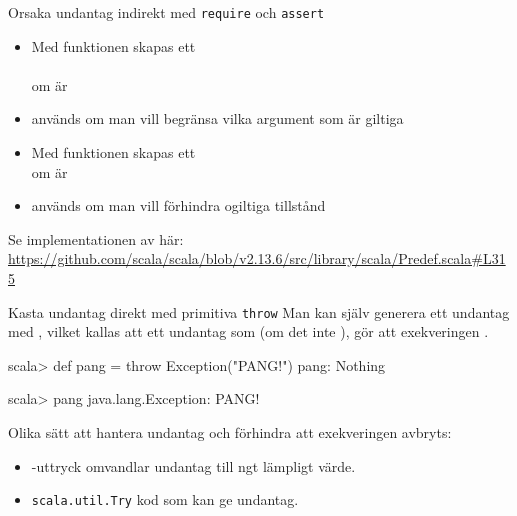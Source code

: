 \begin{Slide}{Orsaka undantag indirekt med \texttt{require} och \texttt{assert}}

\begin{itemize}\SlideFontSmall
  \item Med funktionen  skapas ett \\ \\ om  är 
  \item {} används om man vill begränsa vilka argument som är giltiga
  \item Med funktionen  skapas ett  \\ om  är  
  \item {} används om man vill förhindra ogiltiga tillstånd
\end{itemize}
{
  \ifkompendium\else
  \vfill\SlideFontTiny
  \fi
  Se implementationen av  här:\\
\url{https://github.com/scala/scala/blob/v2.13.6/src/library/scala/Predef.scala#L315}
}
\end{Slide}

\begin{Slide}{Kasta undantag direkt med primitiva \texttt{throw}}\SlideFontSmall
Man kan själv generera ett undantag med , vilket kallas att  ett undantag som (om det inte ), gör att exekveringen .


\begin{REPL}
scala> def pang = throw Exception("PANG!")
pang: Nothing

scala> pang
java.lang.Exception: PANG!

\end{REPL}
\pause
Olika sätt att hantera undantag och förhindra att exekveringen avbryts:
\begin{itemize}
\item {}-uttryck omvandlar undantag till ngt lämpligt värde.

\item \texttt{scala.util.Try}  kod som kan ge undantag.  %
\end{itemize}
\end{Slide}


